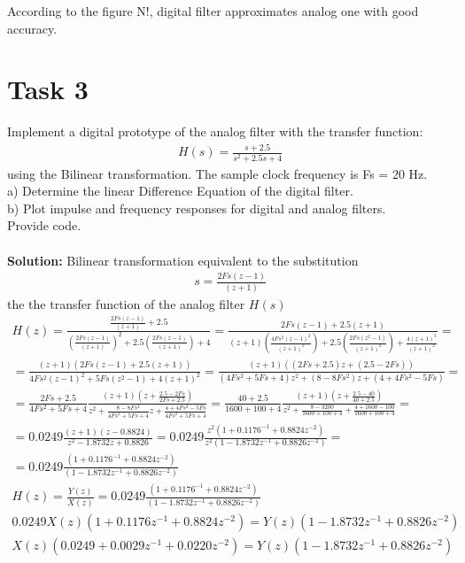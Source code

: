 \documentclass[16pt]{report}
\begin{document}
According to the figure N!, digital filter approximates analog one with good accuracy.


\section*{Task 3}
Implement a digital prototype of the analog filter with the transfer function:
\begin{gather*}
    H(s) = \frac{s+2.5}{s^{2}+2.5s+4} 
\end{gather*}
using the Bilinear transformation. The sample clock frequency is Fs = 20 Hz. \\
a) Determine the linear Difference Equation of the digital filter.\\
b) Plot impulse and frequency responses for digital and analog filters. \\
Provide code. \\ \\
\textbf{Solution:}
Bilinear transformation equivalent to the substitution
\begin{gather*}
    s = \frac{2Fs(z-1)}{(z+1)}
\end{gather*}
the the transfer function of the analog filter $H(s)$
\begin{gather*}
    H(z) = \frac{\frac{2Fs(z-1)}{(z+1)} + 2.5}{(\frac{2Fs(z-1)}{(z+1)})^{2} + 2.5(\frac{2Fs(z-1)}{(z+1)}) + 4} 
    = \frac{2Fs(z-1) + 2.5(z+1)}{(z+1)(\frac{4Fs^{2}(z-1)^{2}}{(z+1)^{2}}) + 2.5(\frac{2Fs(z^2-1)}{(z+1)^2}) + \frac{4(z+1)^2}{(z+1)^2}} = \\
    = \frac{(z+1)(2Fs(z-1) + 2.5(z+1))}{4Fs^{2}(z-1)^{2}+5Fs(z^2-1)+4(z+1)^2} = \frac{(z+1)((2Fs+2.5)z+(2.5-2Fs))}{(4Fs^{2}+5Fs+4)z^{2}+(8-8Fs^{2})z+(4+4Fs^{2}-5Fs)} = \\
    =\frac{2Fs+2.5}{4Fs^{2}+5Fs+4}\frac{(z+1)(z+\frac{2.5-2Fs}{2Fs+2.5})}{z^2+\frac{8-8Fs^2}{4Fs^{2}+5Fs+4}z + \frac{4+4Fs^{2}-5Fs}{4Fs^{2}+5Fs+4}} = \frac{40+2.5}{1600+100+4}\frac{(z+1)(z+\frac{2.5-40}{40+2.5})}{z^2+\frac{8-3200}{1600+100+4}+\frac{4+1600-100}{1600+100+4}} = \\
    = 0.0249 \frac{(z+1)(z-0.8824)}{z^{2}-1.8732z+0.8826} = 
    0.0249 \frac{z^{2}(1+0.1176^{-1}+0.8824z^{-2})}{z^{2}(1-1.8732z^{-1}+0.8826z^{-2})} = \\
    =0.0249\frac{(1+0.1176^{-1}+0.8824z^{-2})}{(1-1.8732z^{-1}+0.8826z^{-2})} \\
    H(z) = \frac{Y(z)}{X(z)} = 0.0249\frac{(1+0.1176^{-1}+0.8824z^{-2})}{(1-1.8732z^{-1}+0.8826z^{-2})} \\
    0.0249X(z)(1+0.1176z^{-1}+0.8824z^{-2}) = Y(z)(1-1.8732z^{-1}+0.8826z^{-2}) \\
    X(z)(0.0249+0.0029z^{-1}+0.0220z^{-2}) = Y(z)(1-1.8732z^{-1}+0.8826z^{-2}) 
\end{gather*}
\end{document}
